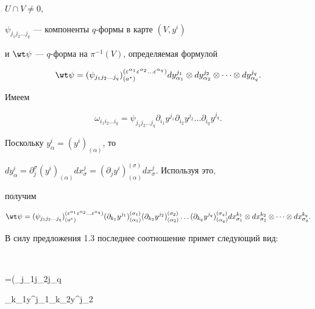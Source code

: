 $U\cap V\ne0$,


$\psi_{j_1j_2\dotsc j_q}$ --- компоненты $q$-формы в карте $(V,y^i)$


и $\wt\psi$ --- $q$-форма на $\pi^{-1}(V)$, определяемая формулой


$$ 


\wt\psi=(\psi_{j_1j_2\dotsc j_q} 


)^{(\varepsilon^{\alpha_1}\varepsilon^{\alpha_2}\dotsc 


\varepsilon^{\alpha_q})}_{(a^*)}dy^{j_1}_{\alpha_1}\otimes 


dy^{j_2}_{\alpha_2}\otimes\dotsb\otimes 


dy^{j_q}_{\alpha_q}.


$$ 


Имеем


$$ 


\omega_{i_1i_2\dotsc i_q}=\psi_{j_1j_2\dotsc j_q}


\partial_{i_1}y^{j_1}\partial_{i_2}y^{j_2}\dotsc


\partial_{i_q}y^{j_q}.


$$ 


Поскольку $y^i_\alpha=(y^i)_{(\alpha)}$, то 


$dy^i_\alpha=\partial^\sigma_j(y^i)_{(\alpha)}dx^j_\sigma= (\partial_j 


y^i)^{(\sigma)}_{(\alpha)}dx^j_\sigma$. Используя это, 


получим 


$$ 


\wt\psi=(\psi_{j_1j_2\dotsc j_q} 


)^{(\varepsilon^{\alpha_1}\varepsilon^{\alpha_2}\dotsc 


\varepsilon^{\alpha_q})}_{(a^*)} 


(\partial_{k_1}y^{j_1})^{(\sigma_1)}_{(\alpha_1)} 


(\partial_{k_2}y^{j_2})^{(\sigma_2)}_{(\alpha_2)}\dotsc 


(\partial_{k_q}y^{j_q})^{(\sigma_q)}_{(\alpha_q)}


dx^{k_1}_{\sigma_1}\otimes dx^{k_2}_{\sigma_2}\otimes\dotsb\otimes 


dx^{k_q}_{\sigma_q}. 


$$ 


В силу предложения 1.3 последнее соотношение примет следующий вид: 


$$ 


\wt\psi=(\psi_{j_1j_2\dotsc j_q} 


\partial_{k_1}y^{j_1}\partial_{k_2}y^{j_2}\dotsc 


